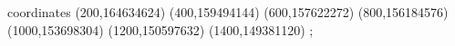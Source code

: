\begin{axis}[
	xlabel={\Huge{minsup}},
	ylabel={\Huge{memoryRSS}},
	xmin=200, xmax=1400,
\addplot+  [red]
	coordinates {
(200,164634624)
(400,159494144)
(600,157622272)
(800,156184576)
(1000,153698304)
(1200,150597632)
(1400,149381120)
	};   
\end{axis}